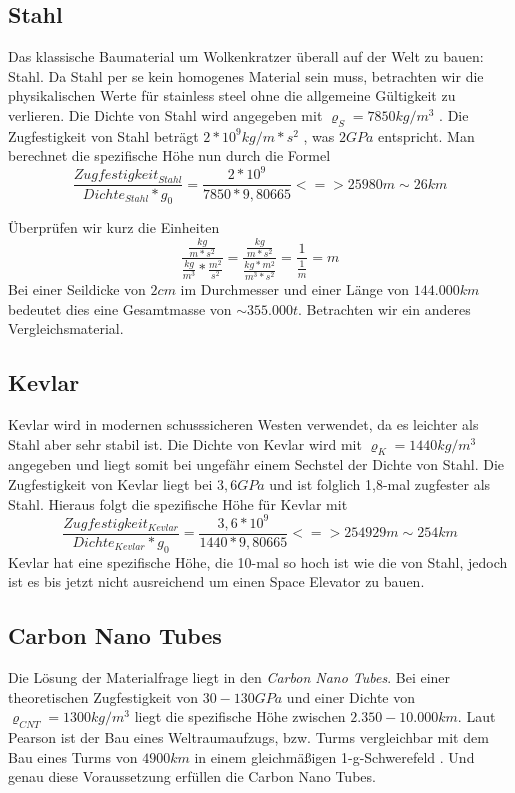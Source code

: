 \documentclass[a4paper, 10pt]{report}
\begin{document}
\subsection{Stahl}
Das klassische Baumaterial um Wolkenkratzer überall auf der Welt zu bauen: Stahl. Da Stahl per se kein homogenes Material sein muss, betrachten wir die physikalischen Werte für stainless steel ohne die allgemeine Gültigkeit zu verlieren. Die Dichte von Stahl wird angegeben mit $\varrho_S = 7850 kg/m^3$ \cite[Vgl.]{PE75}. Die Zugfestigkeit von Stahl beträgt $2*10^9 kg/m*s^2$ , was $2GPa$ entspricht. Man berechnet die spezifische Höhe nun durch die Formel 
\begin{equation}
\frac{Zugfestigkeit_{Stahl}}{Dichte_{Stahl}*g_0} = \frac{2*10^9}{7850*9,80665}
<=> 25 980 m \sim 26 km 
\end{equation}

Überprüfen wir kurz die Einheiten
\begin{equation}
\frac{\frac{kg}{m*s^2}}{\frac{kg}{m^3}*\frac{m^2}{s^2}}= \frac{\frac{kg}{m*s^2}}{\frac{kg*m^2}{m^3*s^2}} = \frac{1}{\frac{1}{m}} = m
\end{equation}
Bei einer Seildicke von $2 cm$ im Durchmesser und einer Länge von $144.000 km$ bedeutet dies eine Gesamtmasse von $\sim 355.000 t$.\cite{PE75}
Betrachten wir ein anderes Vergleichsmaterial.
\subsection{Kevlar}
Kevlar wird in modernen schusssicheren Westen verwendet, da es leichter als Stahl aber sehr stabil ist. Die Dichte von Kevlar wird mit $\varrho_K = 1440 kg/m^3$ angegeben und liegt somit bei ungefähr einem Sechstel der Dichte von Stahl. Die Zugfestigkeit von Kevlar liegt bei $3,6 GPa$ und ist folglich 1,8-mal zugfester als Stahl. Hieraus folgt die spezifische Höhe für Kevlar mit
\begin{equation}
\frac{Zugfestigkeit_{Kevlar}}{Dichte_{Kevlar}*g_0} = \frac{3,6*10^9}{1440*9,80665}
<=> 254 929 m \sim 254 km 
\end{equation}
Kevlar hat eine spezifische Höhe, die 10-mal so hoch ist wie die von Stahl, jedoch ist es bis jetzt nicht ausreichend um einen Space Elevator zu bauen. \cite{PE75}
\subsection{Carbon Nano Tubes}
\label{sec:cnt}
Die Lösung der Materialfrage liegt in den \textsl{Carbon Nano Tubes}.
Bei einer theoretischen Zugfestigkeit von $30 - 130 GPa$ und einer Dichte von $\varrho_{CNT} = 1300 kg/m^3$ liegt die spezifische Höhe zwischen $2.350 - 10.000 km$. Laut Pearson ist der Bau eines Weltraumaufzugs, bzw. Turms vergleichbar mit dem Bau eines Turms von $4900 km$ in einem gleichmäßigen 1-g-Schwerefeld \cite{PE75}. Und genau diese Voraussetzung erfüllen die Carbon Nano Tubes.
\end{document}
